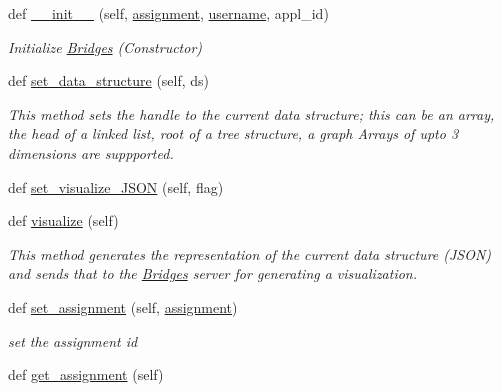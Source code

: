 \begin{DoxyCompactItemize}
\item 
def \mbox{\hyperlink{class_bridges_1_1_bridges_1_1_bridges_ada234978079456870bf2212eaa1be938}{\+\_\+\+\_\+init\+\_\+\+\_\+}} (self, \mbox{\hyperlink{class_bridges_1_1_bridges_1_1_bridges_a33719976eb816d13f632e9342d31b718}{assignment}}, \mbox{\hyperlink{class_bridges_1_1_bridges_1_1_bridges_a4b2e284c3e910633af57a02fe73cc714}{username}}, appl\+\_\+id)
\begin{DoxyCompactList}\small\item\em Initialize \mbox{\hyperlink{class_bridges_1_1_bridges_1_1_bridges}{Bridges}} (Constructor) \end{DoxyCompactList}\item 
def \mbox{\hyperlink{class_bridges_1_1_bridges_1_1_bridges_a2eb292b292544a6d8ff6bb336580f133}{set\+\_\+data\+\_\+structure}} (self, ds)
\begin{DoxyCompactList}\small\item\em This method sets the handle to the current data structure; this can be an array, the head of a linked list, root of a tree structure, a graph Arrays of upto 3 dimensions are suppported. \end{DoxyCompactList}\item 
def \mbox{\hyperlink{class_bridges_1_1_bridges_1_1_bridges_ab7fb96498ecd5ae918ff9d1a8b345940}{set\+\_\+visualize\+\_\+\+J\+S\+ON}} (self, flag)
\item 
def \mbox{\hyperlink{class_bridges_1_1_bridges_1_1_bridges_a7503d1902eee682a0661271c070978c1}{visualize}} (self)
\begin{DoxyCompactList}\small\item\em This method generates the representation of the current data structure (J\+S\+ON) and sends that to the \mbox{\hyperlink{class_bridges_1_1_bridges_1_1_bridges}{Bridges}} server for generating a visualization. \end{DoxyCompactList}\item 
def \mbox{\hyperlink{class_bridges_1_1_bridges_1_1_bridges_aee298de8362388c9aa7d4b95f16199d7}{set\+\_\+assignment}} (self, \mbox{\hyperlink{class_bridges_1_1_bridges_1_1_bridges_a33719976eb816d13f632e9342d31b718}{assignment}})
\begin{DoxyCompactList}\small\item\em set the assignment id \end{DoxyCompactList}\item 
def \mbox{\hyperlink{class_bridges_1_1_bridges_1_1_bridges_a3c127f51ab4a4243c8a4893fa358f72f}{get\+\_\+assignment}} (self)

\end{DoxyCompactItemize}
